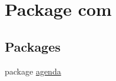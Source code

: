 \hypertarget{namespacecom}{\section{Package com}
\label{namespacecom}
}
\subsection*{Packages}
\begin{DoxyCompactItemize}
\item 
package \hyperlink{namespacecom_1_1agenda}{agenda}
\end{DoxyCompactItemize}
